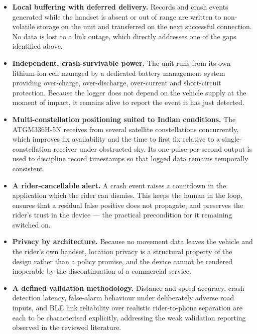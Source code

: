 \documentclass[12pt,a4paper,oneside]{report}
\begin{document}
\begin{itemize}[leftmargin=*,itemsep=0.6em,topsep=0.7em]
\item \textbf{Local buffering with deferred delivery.} Records and crash events generated
while the handset is absent or out of range are written to non-volatile storage on the unit
and transferred on the next successful connection. No data is lost to a link outage, which
directly addresses one of the gaps identified above.

\item \textbf{Independent, crash-survivable power.} The unit runs from its own lithium-ion
cell managed by a dedicated battery management system providing over-charge,
over-discharge, over-current and short-circuit protection. Because the logger does not
depend on the vehicle supply at the moment of impact, it remains alive to report the event
it has just detected.

\item \textbf{Multi-constellation positioning suited to Indian conditions.} The
ATGM336H-5N receives from several satellite constellations concurrently, which improves fix
availability and the time to first fix relative to a single-constellation receiver under
obstructed sky. Its one-pulse-per-second output is used to discipline record timestamps so
that logged data remains temporally consistent.

\item \textbf{A rider-cancellable alert.} A crash event raises a countdown in the
application which the rider can dismiss. This keeps the human in the loop, ensures that a
residual false positive does not propagate, and preserves the rider's trust in the device
--- the practical precondition for it remaining switched on.

\item \textbf{Privacy by architecture.} Because no movement data leaves the vehicle and the
rider's own handset, location privacy is a structural property of the design rather than a
policy promise, and the device cannot be rendered inoperable by the discontinuation of a
commercial service.

\item \textbf{A defined validation methodology.} Distance and speed accuracy, crash
detection latency, false-alarm behaviour under deliberately adverse road inputs, and BLE
link reliability over realistic rider-to-phone separation are each to be characterised
explicitly, addressing the weak validation reporting observed in the reviewed literature.
\end{itemize}
\end{document}
